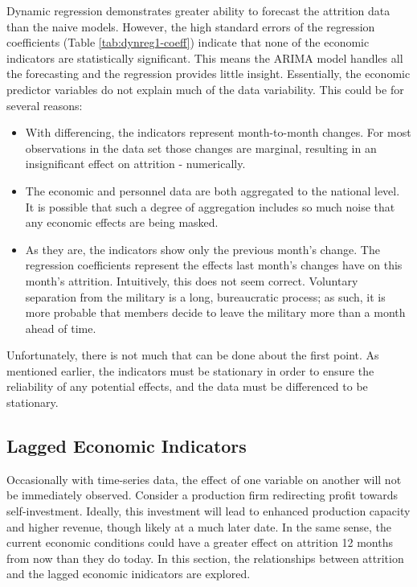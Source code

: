 \documentclass[12pt,letterpaper,toc=flat,oneside]{report}
\theoremstyle{definition}
\theoremstyle{definition}
\theoremstyle{definition}
\theoremstyle{remark}
\begin{document}
Dynamic regression demonstrates greater ability to forecast the
attrition data than the naive models. However, the high standard errors
of the regression coefficients (Table \ref{tab:dynreg1-coeff}) indicate
that none of the economic indicators are statistically significant. This
means the ARIMA model handles all the forecasting and the regression
provides little insight. Essentially, the economic predictor variables
do not explain much of the data variability. This could be for several
reasons:

\begin{itemize}
\item
  With differencing, the indicators represent month-to-month changes.
  For most observations in the data set those changes are marginal,
  resulting in an insignificant effect on attrition - numerically.
\item
  The economic and personnel data are both aggregated to the national
  level. It is possible that such a degree of aggregation includes so
  much noise that any economic effects are being masked.
\item
  As they are, the indicators show only the previous month's change. The
  regression coefficients represent the effects last month's changes
  have on this month's attrition. Intuitively, this does not seem
  correct. Voluntary separation from the military is a long,
  bureaucratic process; as such, it is more probable that members decide
  to leave the military more than a month ahead of time.
\end{itemize}

Unfortunately, there is not much that can be done about the first point.
As mentioned earlier, the indicators must be stationary in order to
ensure the reliability of any potential effects, and the data must be
differenced to be stationary.

\hypertarget{lagged-economic-indicators}{%
\subsection{Lagged Economic
Indicators}\label{lagged-economic-indicators}}

Occasionally with time-series data, the effect of one variable on
another will not be immediately observed. Consider a production firm
redirecting profit towards self-investment. Ideally, this investment
will lead to enhanced production capacity and higher revenue, though
likely at a much later date. In the same sense, the current economic
conditions could have a greater effect on attrition 12 months from now
than they do today. In this section, the relationships between attrition
and the lagged economic inidicators are explored.
\end{document}
